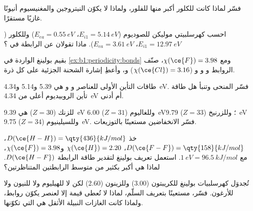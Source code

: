 \begin{exercise}[$\star\star$]\label{exo:b1:periodicity:6}
فسّر لماذا كانت  للكلور أكبر منها للفلور، ولماذا
لا يكوّن النيتروجين والمغنيسيوم أنيونًا غازيًا مستقرًا.
\end{exercise}

\begin{exercise}[$\star\star$]\label{exo:b1:periodicity:7}
احسب كهرسلبيتي موليكن للصوديوم ($E_{i1} =
\qty{5.14}{eV}$، $E_{ea} = \qty{0.55}{eV}$) وللكلور ($E_{i1} =
\qty{12.97}{eV}$، $E_{ea} = \qty{3.61}{eV}$). ماذا تقولان عن
الرابطة في ؟
\end{exercise}

\begin{exercise}[$\star\star$]\label{exo:b1:periodicity:8}
بقيم بولينغ الواردة في \cref{ex:b1:periodicity:bonds} ومع $\chi(\ce{F})
= 3.98$، صنّف الروابط  و و و
($\chi(\ce{Cl}) = 3.16$) و، وأعطِ إشارة الشحنة
الجزئية على كل ذرة.
\end{exercise}

\begin{exercise}[$\star\star$]\label{exo:b1:periodicity:9}
طاقات التأين الأولى للعناصر  و و هي 5.39
و5.14 و\qty{4.34}{eV}. فسّر المنحى وتنبأ هل طاقة تأين
الروبيديوم أعلى من \qty{4.34}{eV} أم أدنى.
\end{exercise}

\begin{exercise}[$\star\star\star$]\label{exo:b1:periodicity:10}
 للزنك ($Z = 30$) هي \qty{9.39}{eV}
وللغاليوم ($Z = 31$) \qty{6.00}{eV}؛ وللزرنيخ ($Z = 33$) \qty{9.79}{eV}
وللسيلينيوم ($Z = 34$) \qty{9.75}{eV}. فسّر الانخفاضين مستعينًا
بالتوزيعات.
\end{exercise}

\begin{exercise}[$\star\star\star$]\label{exo:b1:periodicity:11}
خذ $D(\ce{H-H}) = \qty{436}{kJ/mol}$، $D(\ce{F-F}) =
\qty{158}{kJ/mol}$، $\chi(\ce{H}) = 2.20$ و$\chi(\ce{F}) = 3.98$، مع
$\qty{1}{eV} = \qty{96.5}{kJ/mol}$. استعمل تعريف بولينغ لتقدير
طاقة الرابطة $D(\ce{H-F})$. لماذا هي أكبر بكثير من متوسط
الرابطتين المتناظرتين؟
\end{exercise}

\begin{exercise}[$\star\star\star$]\label{exo:b1:periodicity:12}
تُجدوَل كهرسلبيات بولينغ للكريبتون (3.00) وللزينون
(2.60) لكن لا للهيليوم ولا للنيون ولا للأرغون. فسّر، مستعينًا بتعريف
السلّم، لماذا لا تُعطى قيمة إلا لعنصر يكوّن
روابط، ولماذا كانت الغازات النبيلة الأثقل هي التي تكوّنها.
\end{exercise}

